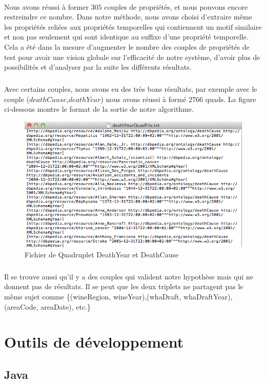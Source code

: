 \paragraph{}
Nous avons réussi à former $305$ couples de propriétés, et nous pouvons encore restreindre ce nombre. Dans notre méthode, nous avons choisi d'extraire même les propriétés reliées aux propriétés temporelles qui contiennent un motif similaire et non pas seulement qui sont identique au suffixe d'une propriété temporelle. Cela a été dans la mesure d'augmenter le nombre des couples de propriétés de test pour avoir une vision globale sur l'efficacité de notre système, d'avoir plus de possibilités et d'analyser par la suite les différents résultats. 
\subparagraph{}
Avec certains couples, nous avons eu des très bons résultats, par exemple avec le couple ($deathCause$,$deathYear$) nous avons réussi à formé $2766$ quads. La figure ci-dessous montre le format de la sortie de notre algorithme.
 \begin{figure}[H]
        \centering
                \includegraphics[width=13cm]{DeathYearCause.png}
               \caption{Fichier de Quadruplet DeathYear et DeathCause}
\end{figure}
\subparagraph{}
Il se trouve aussi qu'il y a des couples qui valident notre hypothèse mais qui ne donnent pas de résultats. Il se peut que les deux triplets ne partagent pas le même sujet comme \{(wineRegion, wineYear),(whaDraft, whaDraftYear),(areaCode, areaDate), etc.\}
\section{Outils de développement}
\subsection{ Java}
